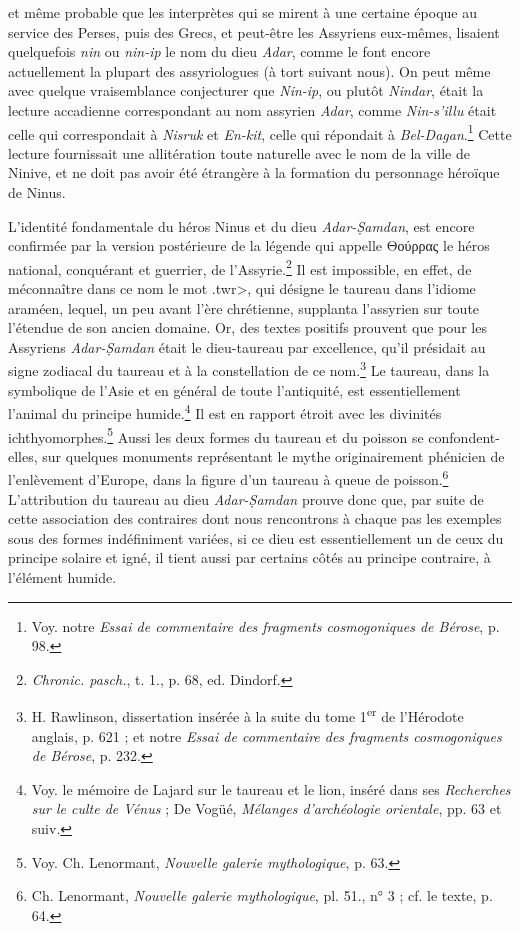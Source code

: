 \documentclass[a4paper, 11pt, oneside]{article}
\begin{document}
et même probable que les interprètes qui se mirent à une certaine époque au service des Perses, puis des Grecs, et peut-être les Assyriens eux-mêmes, lisaient quelquefois \emph{nin} ou \emph{nin-ip} le nom du dieu \emph{Adar}, comme le font encore actuellement la plupart des assyriologues (à tort suivant nous). On peut même avec quelque vraisemblance conjecturer que \emph{Nin-ip}, ou plutôt \emph{Nindar}, était la lecture accadienne correspondant au nom assyrien \emph{Adar}, comme \emph{Nin-s'illu} était celle qui correspondait à \emph{Nisruk} et \emph{En-kit}, celle qui répondait à \emph{Bel-Dagan}.\footnote{Voy. notre \emph{Essai de commentaire des fragments cosmogoniques de Bérose}, p. 98.} Cette lecture fournissait une allitération toute naturelle avec le nom de la ville de Ninive, et ne doit pas avoir été étrangère à la formation du personnage héroïque de Ninus.

L'identité fondamentale du héros Ninus et du dieu \emph{Adar-\d{S}amdan}, est encore confirmée par la version postérieure de la légende qui appelle Θούρρας le héros national, conquérant et guerrier, de l'Assyrie.\footnote{\emph{Chronic. pasch.}, t. 1., p. 68, ed. Dindorf.} Il est impossible, en effet, de méconnaître dans ce nom le mot \<.twr>, qui désigne le taureau dans l'idiome araméen, lequel, un peu avant l'ère chrétienne, supplanta l'assyrien sur toute l'étendue de son ancien domaine. Or, des textes positifs prouvent que pour les Assyriens \emph{Adar-\d{S}amdan} était le dieu-taureau par excellence, qu'il présidait au signe zodiacal du taureau et à la constellation de ce nom.\footnote{H. Rawlinson, dissertation insérée à la suite du tome 1\textsuperscript{er} de l'Hérodote anglais, p. 621 ; et notre \emph{Essai de commentaire des fragments cosmogoniques de Bérose}, p. 232.} Le taureau, dans la symbolique de l'Asie et en général de toute l'antiquité, est essentiellement l'animal du principe humide.\footnote{Voy. le mémoire de Lajard sur le taureau et le lion, inséré dans ses \emph{Recherches sur le culte de Vénus} ; De Vogüé, \emph{Mélanges d'archéologie orientale}, pp. 63 et suiv.} Il est en rapport étroit avec les divinités ichthyomorphes.\footnote{Voy. Ch. Lenormant, \emph{Nouvelle galerie mythologique}, p. 63.} Aussi les deux formes du taureau et du poisson se confondent-elles, sur quelques monuments représentant le mythe originairement phénicien de l'enlèvement d'Europe, dans la figure d'un taureau à queue de poisson.\footnote{Ch. Lenormant, \emph{Nouvelle galerie mythologique}, pl. 51., n° 3 ; cf. le texte, p. 64.} L'attribution du taureau au dieu \emph{Adar-\d{S}amdan} prouve donc que, par suite de cette association des contraires dont nous rencontrons à chaque pas les exemples sous des formes indéfiniment variées, si ce dieu est essentiellement un de ceux du principe solaire et igné, il tient aussi par certains côtés au principe contraire, à l'élément humide.
\end{document}
